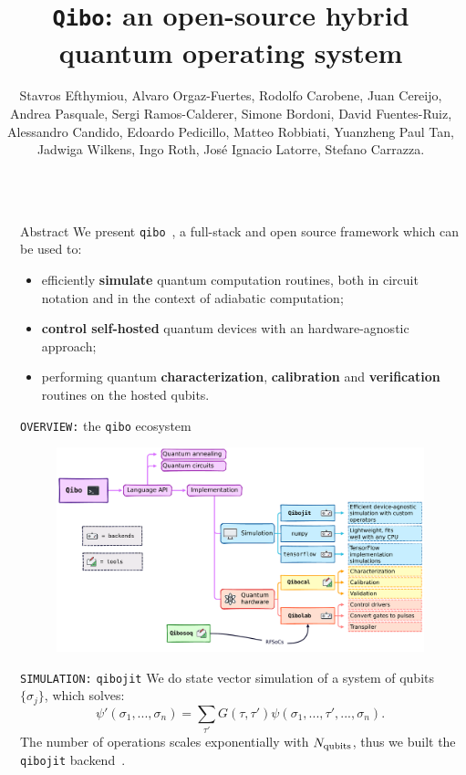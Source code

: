 \documentclass[20pt, final]{beamer}
\title{\texttt{Qibo}: an open-source hybrid quantum operating system}
\author{Stavros Efthymiou, Alvaro Orgaz-Fuertes, Rodolfo Carobene, Juan Cereijo, 
Andrea Pasquale, Sergi Ramos-Calderer, Simone Bordoni, David Fuentes-Ruiz, 
Alessandro Candido, Edoardo Pedicillo, Matteo Robbiati, Yuanzheng Paul Tan, 
Jadwiga Wilkens, Ingo Roth, José Ignacio Latorre, Stefano Carrazza.}
\newlength{\sepwidth}
\newlength{\colwidth}
\newcommand{\separatorcolumn}{\begin{column}{\sepwidth}\end{column}}
\begin{document}
\begin{frame}[t]
\begin{columns}[t]
\separatorcolumn

\begin{column}{\colwidth}

  \begin{block}{Abstract}
    We present \texttt{qibo}~\cite{Efthymiou_2021}, a full-stack and open source framework which can be 
    used to:
    
    \begin{itemize}
      \item[\faCode] efficiently \textbf{simulate} quantum computation routines, both in 
      circuit notation and in the context of adiabatic computation;
      \item[\faCogs] \textbf{control self-hosted} quantum devices with an hardware-agnostic
      approach;
      \item[\faPencil] performing quantum \textbf{characterization}, \textbf{calibration} and 
      \textbf{verification} routines on the hosted qubits.
    \end{itemize}
  
  \end{block}

  \begin{block}{\texttt{OVERVIEW:} the \texttt{qibo} ecosystem}
  \begin{figure}
    \includegraphics[width=1  \textwidth]{figures/qibo_ecosystem.pdf}
  \end{figure}
  \end{block}

  \begin{block}{\texttt{SIMULATION:} \texttt{qibojit}}
  We do state vector simulation of a system of qubits $\{\sigma_j\}$, 
  which solves:
  \begin{equation}
  \psi'(\sigma_1, ..., \sigma_n) = \sum_{\tau'}G(\tau, \tau') \psi(\sigma_1, ..., 
  \tau', ..., \sigma_n).
  \end{equation}
  The number of operations scales exponentially with $N_{\rm qubits}$, thus we 
  built the \texttt{qibojit} backend~\cite{Efthymiou_2022}.


\end{block}
\end{column}
\end{columns}
\end{frame}
\end{document}
